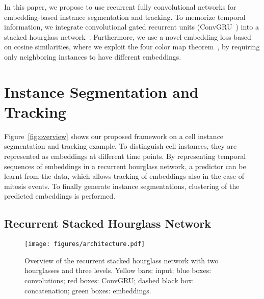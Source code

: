 \documentclass[runningheads,a4paper]{llncs}
\begin{document}
In this paper, we propose to use recurrent fully convolutional networks for embedding-based instance segmentation and tracking.
To memorize temporal information, we integrate convolutional gated recurrent units (\mbox{ConvGRU}~\cite{Ballas2015}) into a stacked hourglass network~\cite{Newell2016}. %
Furthermore, we use a novel embedding loss based on cosine similarities, where we exploit the four color map theorem~\cite{Appel1976}, by requiring only neighboring instances to have different embeddings.















\section{Instance Segmentation and Tracking}
\label{sec:instance_tracking}


Figure~\ref{fig:overview} shows our proposed framework on a cell instance segmentation and tracking example.
To distinguish cell instances, they are represented as embeddings at different time points.
By representing temporal sequences of embeddings in a recurrent hourglass network, a predictor can be learnt from the data, which allows tracking of embeddings also in the case of mitosis events.
To finally generate instance segmentations, clustering of the predicted embeddings is performed.



\subsection{Recurrent Stacked Hourglass Network}
\label{subsec:network}

\begin{figure}[t]
\centering
\texttt{[image: figures/architecture.pdf]}
\caption{Overview of the recurrent stacked hourglass network with two hourglasses and three levels.
Yellow bars: input; blue boxes: convolutions; red boxes: \mbox{ConvGRU}; dashed black box: concatenation; green boxes: embeddings.}
\label{fig:architecture}
\end{figure}
\end{document}
